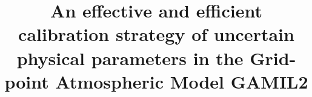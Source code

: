 \documentclass[gmd, manuscript]{copernicus}
\begin{document}
\linenumbers

\title{An effective and efficient calibration strategy of uncertain physical parameters in the Grid-point Atmospheric Model GAMIL2}

















\maketitle
 
\end{document}
